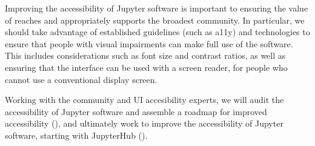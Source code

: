 \begin{task}[
  title=Accessibility in Jupyter,
  id=accessibility,
  lead=SRL,
  PM=12,
  wphases={12-36},
  partners={}
]

  Improving the accessibility of Jupyter software
  is important to ensuring the value of \TheProject reaches and appropriately supports
  the broadest community.
  In particular, we should take advantage of established guidelines (such as a11y) and
  technologies to ensure that people with visual impairments can make full use
  of the software.
  This includes considerations such as font size and contrast ratios,
  as well as ensuring that the interface can be used with a screen reader,
  for people who cannot use a conventional display screen.

  Working with the community and UI accesibility experts, we will audit the accessibility 
  of Jupyter software and assemble a roadmap for improved accessibility
  (),
  and ultimately work to improve the accessibility of Jupyter software,
  starting with JupyterHub ().
\end{task}
